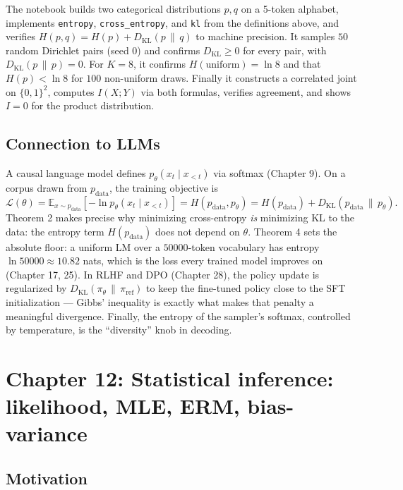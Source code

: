 \documentclass[11pt]{article}
\theoremstyle{remark}
\begin{document}
The notebook builds two categorical distributions $p, q$ on a 5-token alphabet, implements \texttt{entropy}, \texttt{cross\_entropy}, and \texttt{kl} from the definitions above, and verifies $H(p, q) = H(p) + D_{\mathrm{KL}}(p \,\|\, q)$ to machine precision. It samples $50$ random Dirichlet pairs (seed $0$) and confirms $D_{\mathrm{KL}} \geq 0$ for every pair, with $D_{\mathrm{KL}}(p \,\|\, p) = 0$. For $K = 8$, it confirms $H(\text{uniform}) = \ln 8$ and that $H(p) < \ln 8$ for $100$ non-uniform draws. Finally it constructs a correlated joint on $\{0, 1\}^2$, computes $I(X; Y)$ via both formulas, verifies agreement, and shows $I = 0$ for the product distribution.

\subsection*{Connection to LLMs}

A causal language model defines $p_\theta(x_t \mid x_{<t})$ via softmax (Chapter 9). On a corpus drawn from $p_{\mathrm{data}}$, the training objective is
\[
\mathcal{L}(\theta) = \mathbb{E}_{x \sim p_{\mathrm{data}}}\!\left[-\ln p_\theta(x_t \mid x_{<t})\right] = H(p_{\mathrm{data}}, p_\theta) = H(p_{\mathrm{data}}) + D_{\mathrm{KL}}(p_{\mathrm{data}} \,\|\, p_\theta).
\]
Theorem 2 makes precise why minimizing cross-entropy \emph{is} minimizing KL to the data: the entropy term $H(p_{\mathrm{data}})$ does not depend on $\theta$. Theorem 4 sets the absolute floor: a uniform LM over a $50000$-token vocabulary has entropy $\ln 50000 \approx 10.82$ nats, which is the loss every trained model improves on (Chapter 17, 25). In RLHF and DPO (Chapter 28), the policy update is regularized by $D_{\mathrm{KL}}(\pi_\theta \,\|\, \pi_{\mathrm{ref}})$ to keep the fine-tuned policy close to the SFT initialization --- Gibbs' inequality is exactly what makes that penalty a meaningful divergence. Finally, the entropy of the sampler's softmax, controlled by temperature, is the ``diversity'' knob in decoding.


\section*{Chapter 12: Statistical inference: likelihood, MLE, ERM, bias-variance}

\subsection*{Motivation}
\end{document}
